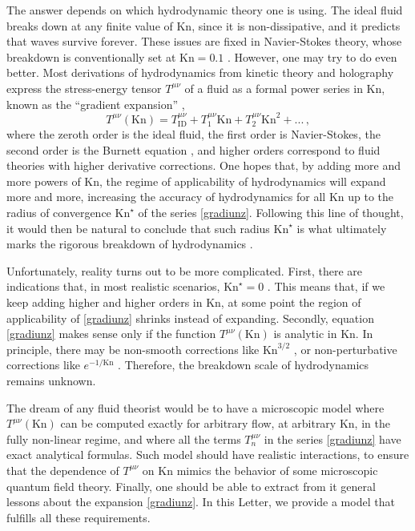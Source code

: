 \documentclass[a4paper, amsfonts, amssymb, amsmath, reprint, showkeys, twoside,notitlepage]{revtex4-2}
\newcommand{\Kn}{\text{Kn}}
\begin{document}
The answer depends on which hydrodynamic theory one is using. The ideal fluid breaks down at any finite value of $\Kn$, since it is non-dissipative, and it predicts that waves survive forever. These issues are fixed in Navier-Stokes theory, whose breakdown is conventionally set at $\Kn=0.1$ \cite{Struchtrup2011}. However, one may try to do even better. Most derivations of hydrodynamics from kinetic theory \cite{RochaBDNK2022ind,RochaReview2023ilf} and holography \cite{Baier2008,GrozdanovStuff2019}  express the stress-energy tensor $T^{\mu \nu}$ of a fluid as a formal power series in $\Kn$, known as the ``gradient expansion'' \cite{Struchtrup2011,Kovtun2019},
\begin{equation}\label{gradiunz}
    T^{\mu \nu}(\Kn)= T^{\mu \nu}_{\text{ID}}+T^{\mu \nu}_1 \Kn +T^{\mu \nu}_2 \Kn^2+...\, ,
\end{equation}
where the zeroth order is the ideal fluid, the first order is Navier-Stokes, the second order is the Burnett equation \cite{Struchup2005}, and higher orders correspond to fluid theories with higher derivative corrections. One hopes that, by adding more and more powers of $\Kn$, the regime of applicability of hydrodynamics will expand more and more, increasing the accuracy of hydrodynamics for all $\Kn$ up to the radius of convergence $\Kn^\star$ of the series \eqref{gradiunz}. Following this line of thought, it would then be natural to conclude that such radius $\Kn^\star$ is what ultimately marks the rigorous breakdown of hydrodynamics \cite{HellerHydroHedron2023jtd}.


Unfortunately, reality turns out to be more complicated. First, there are indications that, in most realistic scenarios, $\Kn^\star=0$ \cite{HellerGradexp2021,HellerSingulant2022,HellerBeyondBjorken2022}.  This means that, if we keep adding higher and higher orders in $\Kn$, at some point the region of applicability of \eqref{gradiunz} shrinks instead of expanding. Secondly, equation \eqref{gradiunz} makes sense only if the function $T^{\mu \nu}(\Kn)$ is analytic in $\Kn$. In principle, there may be non-smooth corrections like $\Kn^{3/2}$ \cite{KovtunStickiness2011}, or non-perturbative corrections like $e^{-1/\Kn}$ \cite{DenicolNoronhaDivergence2016bjh}. Therefore, the breakdown scale of hydrodynamics remains unknown.

The dream of any fluid theorist would be to have a microscopic model where $T^{\mu \nu}(\Kn)$ can be computed exactly for arbitrary flow, at arbitrary $\Kn$, in the fully non-linear regime, and where all the terms $T^{\mu \nu}_n$ in the series \eqref{gradiunz} have exact analytical formulas. Such model should have realistic interactions, to ensure that the dependence of $T^{\mu \nu}$ on $\Kn$ mimics the behavior of some microscopic quantum field theory. Finally, one should be able to extract from it general lessons about the expansion \eqref{gradiunz}. In this Letter, we provide a model that fulfills all these requirements.
\end{document}
